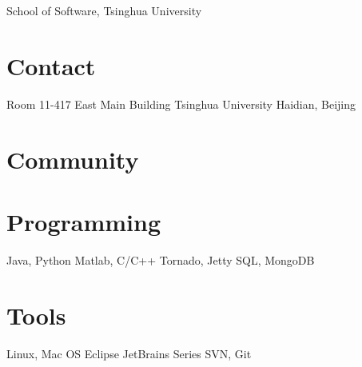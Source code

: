 \documentclass[]{friggeri-cv}
\begin{document}
       {School of Software, Tsinghua University}

\begin{aside}
  \section{Contact}
    Room 11-417
    East Main Building
    Tsinghua University
    Haidian, Beijing
  \section{Community}
  \section{Programming}
    Java, Python
    Matlab, C/C++
    Tornado, Jetty
    SQL, MongoDB
  \section{Tools}
    Linux, Mac OS
    Eclipse
    JetBrains Series
    SVN, Git
\end{aside}

\end{document}

